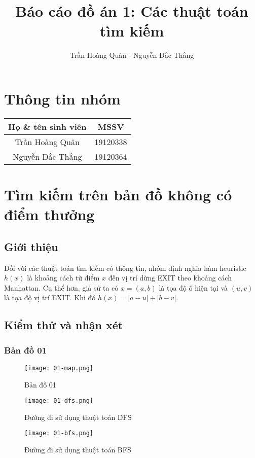 \documentclass{article}
\title{Báo cáo đồ án 1: Các thuật toán tìm kiếm}
\author{Trần Hoàng Quân - Nguyễn Đắc Thắng}
\begin{document}
\maketitle
\tableofcontents
\pagebreak

\section{Thông tin nhóm}
\begin{table}[ht]
\centering
\begin{tabular}{|c|c|}
\hline
Họ \& tên sinh viên & MSSV \\
\hline
Trần Hoàng Quân & 19120338 \\
Nguyễn Đắc Thắng & 19120364 \\
\hline
\end{tabular}
\end{table}

\section{Tìm kiếm trên bản đồ không có điểm thưởng}
\subsection{Giới thiệu}
Đối với các thuật toán tìm kiếm có thông tin, nhóm định nghĩa hàm heuristic $h(x)$ là khoảng cách từ điểm $x$ đến vị trí dừng EXIT theo khoảng cách Manhattan. Cụ thể hơn, giả sử ta có $x = (a, b)$ là tọa độ ô hiện tại và $(u, v)$ là tọa độ vị trí EXIT. Khi đó $h(x) = |a-u| + |b-v|$.
\subsection{Kiểm thử và nhận xét}
\subsubsection{Bản đồ 01}
\begin{figure}[H]
\centering
\texttt{[image: 01-map.png]}
\caption{Bản đồ 01}
\end{figure}

\begin{figure}[H]
\centering
\texttt{[image: 01-dfs.png]}
\caption{Đường đi sử dụng thuật toán DFS}
\end{figure}

\begin{figure}[H]
\centering
\texttt{[image: 01-bfs.png]}
\caption{Đường đi sử dụng thuật toán BFS}
\end{figure}
\end{document}
